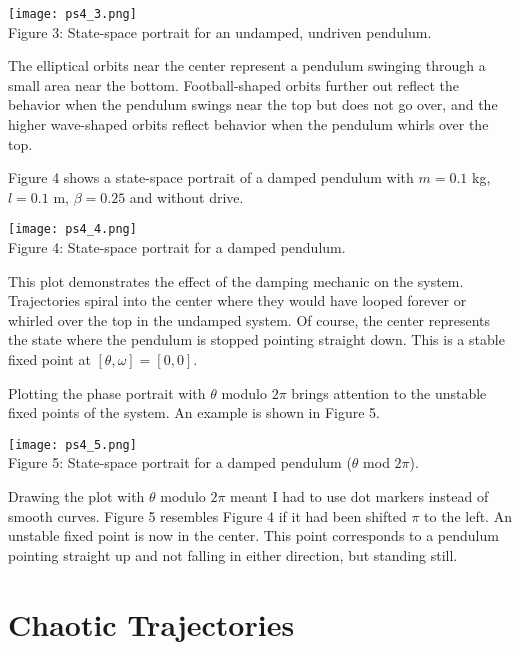 \documentclass[12pt, letterpaper]{article}
\begin{document}
\begin{center}
\texttt{[image: ps4\_3.png]}
\\
Figure 3: State-space portrait for an undamped, undriven pendulum.
\end{center}

The elliptical orbits near the center represent a pendulum swinging through a 
small area near the bottom. Football-shaped orbits further out reflect the 
behavior when the pendulum swings near the top but does not go over, and the 
higher wave-shaped orbits reflect behavior when the pendulum whirls over the 
top.

Figure 4 shows a state-space portrait of a damped pendulum with $m=0.1$ kg, 
$l=0.1$ m, $\beta=0.25$ and without drive. 

\begin{center}
\texttt{[image: ps4\_4.png]}
\\
Figure 4: State-space portrait for a damped pendulum.
\end{center}

This plot demonstrates the effect of the damping mechanic on the system. 
Trajectories spiral into the center where they would have looped forever or 
whirled over the top in the undamped system. Of course, the center represents 
the state where the pendulum is stopped pointing straight down. This is a stable
fixed point at $[\theta, \omega] = [0, 0]$. 

Plotting the phase portrait with $\theta$ modulo $2\pi$ brings attention to the
unstable fixed points of the system. An example is shown in Figure 5. 

\begin{center}
\texttt{[image: ps4\_5.png]}
\\
Figure 5: State-space portrait for a damped pendulum ($\theta$ mod $2\pi$).
\end{center}

Drawing the plot with $\theta$ modulo $2\pi$ meant I had to use dot markers 
instead of smooth curves. Figure 5 resembles Figure 4 if it had been shifted 
$\pi$ to the left. An unstable fixed point is now in the center. This point
corresponds to a pendulum pointing straight up and not falling in either 
direction, but standing still.

\section*{Chaotic Trajectories}
\end{document}

